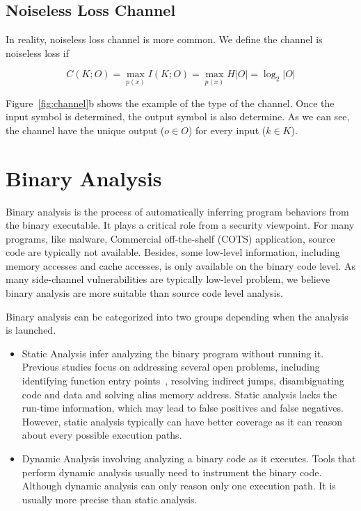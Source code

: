 \subsection{Noiseless Loss Channel}
In reality, noiseless loss channel is more common. We define the channel is noiseless loss if

\begin{equation} \label{eq:2}
    C(K;O) = \max_{p(x)} I(K;O) = \max_{p(x)} H |O| = \log_2 {|O|}
\end{equation}

Figure~\ref{fig:channel}b  shows the example of the type of the channel. Once the input symbol is determined, the output symbol is also determine. As we can see, the channel have the unique output ($o \in O$) for every input ($k \in K$).

\section{Binary Analysis}
Binary analysis is the process of automatically inferring program behaviors from
the binary executable.
It plays a critical role from a security viewpoint. For many programs, like malware, Commercial off-the-shelf (COTS) application, source code are typically not
available. Besides, some low-level information, including memory accesses and cache
accesses, is only available on the binary code level. As many side-channel vulnerabilities
are typically low-level problem, we believe binary analysis are more suitable than
source code level analysis.

Binary analysis can be categorized into two groups depending when the analysis is
launched.
\begin{itemize}
    \item Static Analysis infer analyzing the binary program without running it. Previous studies focus on addressing several open problems, including identifying
    function entry points~\cite{184521, Wang17a}, resolving indirect jumps, disambiguating code and data and solving alias memory address. Static analysis
    lacks the run-time information, which may lead to false positives and false 
    negatives. However, static analysis typically can have better coverage as it can
    reason about every possible execution paths.
    \item Dynamic Analysis involving analyzing a binary code as it executes. Tools
    that perform dynamic analysis usually need to instrument the binary code.  
    Although dynamic analysis can only reason only one execution path. It is usually more precise than static analysis.
\end{itemize}

